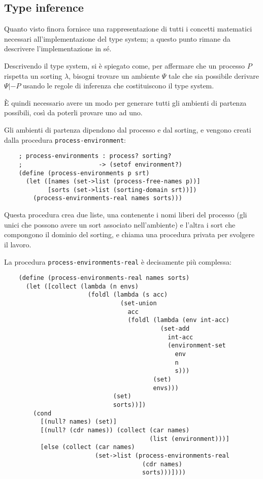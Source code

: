 \subsection{Type inference}

Quanto visto finora fornisce una rappresentazione di tutti i concetti
matematici necessari all'implementazione del type system; a questo punto
rimane da descrivere l'implementazione in s\'e.

Descrivendo il type system, si \`e spiegato come, per affermare che
un processo $P$ rispetta un sorting $\lambda$, bisogni trovare un
ambiente $\Psi$ tale che sia possibile derivare $\Psi |- P$ usando le
regole di inferenza che costituiscono il type system.

\`E quindi necessario avere un modo per generare tutti gli ambienti
di partenza possibili, cos\`i da poterli provare uno ad uno.

Gli ambienti di partenza dipendono dal processo e dal sorting, e vengono
creati dalla procedura \lstinline{process-environment}:

\begin{lstlisting}
    ; process-environments : process? sorting?
    ;                     -> (setof environment?)
    (define (process-environments p srt)
      (let ([names (set->list (process-free-names p))]
            [sorts (set->list (sorting-domain srt))])
        (process-environments-real names sorts)))
\end{lstlisting}

Questa procedura crea due liste, una contenente i nomi liberi del
processo (gli unici che possono avere un sort associato nell'ambiente)
e l'altra i sort che compongono il dominio del sorting, e chiama una
procedura privata per svolgere il lavoro.

La procedura \lstinline{process-environments-real} \`e decisamente
pi\`u complessa:

\begin{lstlisting}
    (define (process-environments-real names sorts)
      (let ([collect (lambda (n envs)
                       (foldl (lambda (s acc)
                                (set-union
                                  acc
                                  (foldl (lambda (env int-acc)
                                           (set-add
                                             int-acc
                                             (environment-set
                                               env
                                               n
                                               s)))
                                         (set)
                                         envs)))
                              (set)
                              sorts))])
        (cond
          [(null? names) (set)]
          [(null? (cdr names)) (collect (car names)
                                        (list (environment)))]
          [else (collect (car names)
                         (set->list (process-environments-real
                                      (cdr names)
                                      sorts)))])))
\end{lstlisting}

